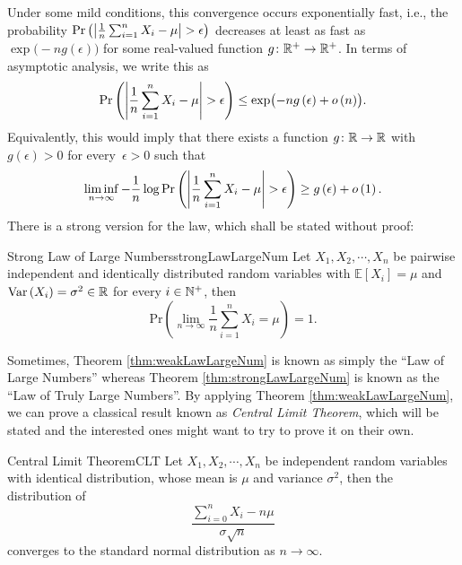 \documentclass[math]{amznotes}
\theoremstyle{remark}
\newcommand{\0}{\mathbf{0}}
\newcommand{\1}{\mathbf{1}}
\begin{document}
Under some mild conditions, this convergence occurs exponentially fast, i.e., the probability $\mathrm{Pr}\left({\left\lvert {\frac{1}{n}\sum_{i = 1}^nX_i - \mu} \right\rvert} > \epsilon\right)$ decreases at least as fast as $\exp\bigl(-ng\left(\epsilon\right)\bigr)$ for some real-valued function $g \colon \mathbb{R}^+ \to \mathbb{R}^+$. In terms of asymptotic analysis, we write this as 
\begin{equation*}
    \mathrm{Pr}\left({\left\lvert {\frac{1}{n}\sum_{i = 1}^nX_i - \mu} \right\rvert} > \epsilon\right) \leq \exp\bigl(-ng\left(\epsilon\right) + o\left(n\right)\bigr).
\end{equation*}
Equivalently, this would imply that there exists a function $g \colon \mathbb{R} \to \mathbb{R}$ with $g\left(\epsilon\right) > 0$ for every~$\epsilon > 0$ such that 
\begin{equation*}
    \liminf_{n \to \infty}-\frac{1}{n}\log\mathrm{Pr}\left({\left\lvert {\frac{1}{n}\sum_{i = 1}^nX_i - \mu} \right\rvert} > \epsilon\right) \geq g\left(\epsilon\right) + o\left(1\right).
\end{equation*}
There is a strong version for the law, which shall be stated without proof:
\begin{thmbox}{Strong Law of Large Numbers}{strongLawLargeNum}
    Let $X_1, X_2, \cdots, X_n$ be pairwise independent and identically distributed random variables with $\mathbb{E}[X_i] = \mu$ and $\mathrm{Var}\left(X_i\right) = \sigma^2 \in \mathbb{R}$ for every $i \in \mathbb{N}^+$, then 
    \begin{equation*}
        \mathrm{Pr}\left(\lim_{n \to \infty}\frac{1}{n}\sum_{i = 1}^{n}X_i = \mu\right) = 1.
    \end{equation*}
\end{thmbox}
Sometimes, Theorem \ref{thm:weakLawLargeNum} is known as simply the ``Law of Large Numbers'' whereas Theorem \ref{thm:strongLawLargeNum} is known as the ``Law of Truly Large Numbers''. By applying Theorem \ref{thm:weakLawLargeNum}, we can prove a classical result known as \textit{Central Limit Theorem}, which will be stated and the interested ones might want to try to prove it on their own.
\begin{thmbox}{Central Limit Theorem}{CLT}
    Let $X_1, X_2, \cdots, X_n$ be independent random variables with identical distribution, whose mean is $\mu$ and variance $\sigma^2$, then the distribution of
    \begin{equation*}
        \frac{\sum_{i = 0}^{n}X_i - n\mu}{\sigma\sqrt{n}}
    \end{equation*}
    converges to the standard normal distribution as $n \to \infty$.
\end{thmbox}
\end{document}
